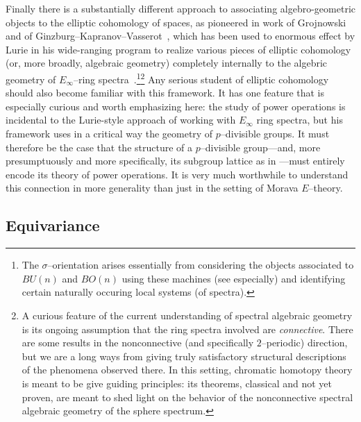 Finally there is a substantially different approach to associating algebro-geometric objects to the elliptic cohomology of spaces, as pioneered in work of Grojnowski~\cite{Grojnowski} and of Ginzburg--Kapranov--Vasserot~\cite{GKV}, which has been used to enormous effect by Lurie in his wide-ranging program to realize various pieces of elliptic cohomology (or, more broadly, algebraic geometry) completely internally to the algebric geometry of \(E_\infty\)--ring spectra~\cite{LurieSurveyOfEll}.\footnote{The \(\sigma\)--orientation arises essentially from considering the objects associated to \(BU(n)\) and \(BO(n)\) using these machines (see \cite[Section 5.1]{LurieSurveyOfEll} especially) and identifying certain naturally occuring local systems (of spectra).}\footnote{A curious feature of the current understanding of spectral algebraic geometry is its ongoing assumption that the ring spectra involved are \emph{connective}.  There are some results in the nonconnective (and specifically $2$--periodic) direction, but we are a long ways from giving truly satisfactory structural descriptions of the phenomena observed there.  In this setting, chromatic homotopy theory is meant to be give guiding principles: its theorems, classical and not yet proven, are meant to shed light on the behavior of the nonconnective spectral algebraic geometry of the sphere spectrum.}  Any serious student of elliptic cohomology should also become familiar with this framework.  It has one feature that is especially curious and worth emphasizing here: the study of power operations is incidental to the Lurie-style approach of working with \(E_\infty\) ring spectra, but his framework uses in a critical way the geometry of \(p\)--divisible groups.  It must therefore be the case that the structure of a \(p\)--divisible group---and, more presumptuously and more specifically, its subgroup lattice as in ---must entirely encode its theory of power operations.  It is very much worthwhile to understand this connection in more generality than just in the setting of Morava \(E\)--theory.







\subsection*{Equivariance}

